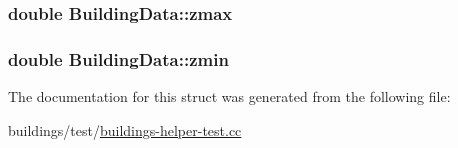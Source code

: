 \subsubsection[{\texorpdfstring{zmax}{zmax}}]{\setlength{\rightskip}{0pt plus 5cm}double Building\+Data\+::zmax}\hypertarget{structBuildingData_ad60a7b083575d15baa6e6828cd390763}{}\label{structBuildingData_ad60a7b083575d15baa6e6828cd390763}
\subsubsection[{\texorpdfstring{zmin}{zmin}}]{\setlength{\rightskip}{0pt plus 5cm}double Building\+Data\+::zmin}\hypertarget{structBuildingData_aa20a7f4c0ef0e729d5f1072a0d88d8ae}{}\label{structBuildingData_aa20a7f4c0ef0e729d5f1072a0d88d8ae}


The documentation for this struct was generated from the following file\+:\begin{DoxyCompactItemize}
\item 
buildings/test/\hyperlink{buildings-helper-test_8cc}{buildings-\/helper-\/test.\+cc}\end{DoxyCompactItemize}
